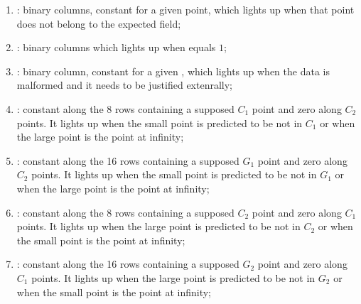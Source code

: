 \begin{enumerate}[resume]

      \item \both{\malformedDataBit} \blsPrediction{}: binary columns, constant for a given point, which lights up when that point does not belong to the expected field; %
      \item \both{\malformedDataAcc}: binary columns which lights up when \malformedDataBit{} equals $1$;              
      \item \both{\malformedDataExternalJustification}: binary column, constant for a given \blsId, which lights up when the data is malformed and it needs to be justified extenrally;
      
      \item \both{\cOneMembershipTestRequired}:
            constant along the 8 rows containing a supposed $C_1$ point and zero along $C_2$ points. It lights up when the small point is predicted to be not in $C_1$ or when the large point is the point at infinity; 
      \item \both{\gOneMembershipTestRequired}:
            constant along the 16 rows containing a supposed $G_1$ point and zero along $C_2$ points. It lights up when the small point is predicted to be not in $G_1$ or when the large point is the point at infinity; 
      \item \both{\cTwoMembershipTestRequired}:
            constant along the 8 rows containing a supposed $C_2$ point and zero along $C_1$ points. It lights up when the large point is predicted to be not in $C_2$ or when the small point is the point at infinity;
      \item \both{\gTwoMembershipTestRequired}:
            constant along the 16 rows containing a supposed $G_2$ point and zero along $C_1$ points. It lights up when the large point is predicted to be not in $G_2$ or when the small point is the point at infinity;
\end{enumerate}
     
